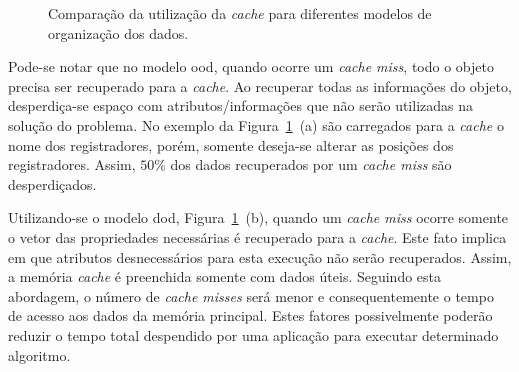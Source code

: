 \begin{figure}[h!t]
    \caption[Comparação da utilização da \textit{cache}]{Comparação da utilização da \textit{cache} para diferentes modelos de organização dos dados.}
    \label{fig:cache_register_clustering}
\end{figure}

Pode-se notar que no modelo \ac{ood}, quando ocorre um \textit{cache miss}, todo o objeto precisa ser recuperado para a \textit{cache}. Ao recuperar todas as informações do objeto, desperdiça-se espaço com atributos/informações que não serão utilizadas na solução do problema. No exemplo da Figura~\ref{fig:cache_register_clustering}~(a) são carregados para a \textit{cache} o nome dos registradores, porém, somente deseja-se alterar as posições dos registradores. Assim, $50\%$ dos dados recuperados por um \textit{cache miss} são desperdiçados.



Utilizando-se o modelo \ac{dod}, Figura~\ref{fig:cache_register_clustering}~(b), quando um \textit{cache miss} ocorre somente o vetor das propriedades necessárias é recuperado para a \textit{cache}. Este fato implica em que atributos desnecessários para esta execução não serão recuperados. Assim, a memória \textit{cache} é preenchida somente com dados úteis.
Seguindo esta abordagem, o número de \textit{cache misses} será menor e consequentemente o tempo de acesso aos dados da memória principal. Estes fatores possivelmente poderão reduzir o tempo total despendido por uma aplicação para executar determinado algoritmo.



